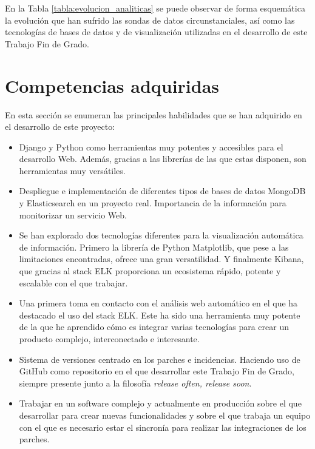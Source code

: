 \documentclass[a4paper, 12pt]{book}
\begin{document}
				
		En la Tabla \ref{tabla:evolucion_analiticas} se puede observar de forma esquemática la evolución que han sufrido las sondas de datos circunstanciales, así como las tecnologías de bases de datos y de visualización utilizadas en el desarrollo de este Trabajo Fin de Grado.\\
	\section{Competencias adquiridas} 
	\label{sec:competencias_adquiridas} 
	
		En esta sección se enumeran las principales habilidades que se han adquirido en el desarrollo de este proyecto:
		\begin{itemize}
			\item Django y Python como herramientas muy potentes y accesibles para el desarrollo Web. Además, gracias a las librerías de las que estas disponen, son herramientas muy versátiles.\\
			
			\item Despliegue e implementación de diferentes tipos de bases de datos MongoDB y Elasticsearch en un proyecto real. Importancia de la información para monitorizar un servicio Web.\\
			
			\item Se han explorado dos tecnologías diferentes para la visualización automática de información. Primero la librería de Python Matplotlib, que pese a las limitaciones encontradas, ofrece una gran versatilidad. Y finalmente Kibana, que gracias al stack ELK proporciona un ecosistema rápido, potente y escalable con el que trabajar. \\
			
			\item Una primera toma en contacto con el análisis web automático en el que ha destacado el uso del stack ELK. Este ha sido una herramienta muy potente de la que he aprendido cómo es integrar varias tecnologías para crear un producto complejo, interconectado e interesante. \\
			
			
			\item Sistema de versiones centrado en los parches e incidencias. Haciendo uso de GitHub como repositorio en el que desarrollar este Trabajo Fin de Grado, siempre presente junto a la filosofía \textit{release often, release soon}. \\
			
			\item Trabajar en un software complejo y actualmente en producción sobre el que desarrollar para crear nuevas funcionalidades y sobre el que trabaja un equipo con el que es necesario estar el sincronía para realizar las integraciones de los parches. \\
			
		\end{itemize}
\end{document}
